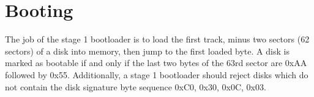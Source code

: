\documentclass{article}
\begin{document}
\section{Booting}

The job of the stage 1 bootloader is to load the first track, minus two sectors (62 sectors) of a disk into memory, then jump to the first loaded byte.
A disk is marked as bootable if and only if the last two bytes of the 63rd sector are 0xAA followed by 0x55. Additionally, a stage 1 bootloader should
reject disks which do not contain the disk signature byte sequence 0xC0, 0x30, 0x0C, 0x03.
\end{document}
